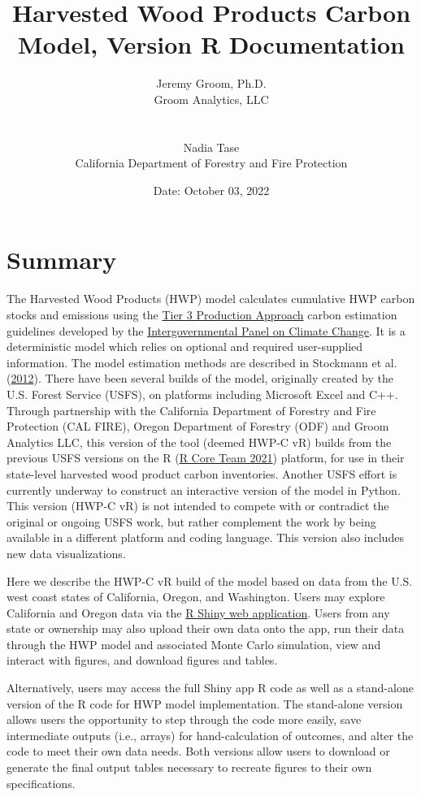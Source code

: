 \documentclass[
  openany]{book}
\title{Harvested Wood Products Carbon Model, Version R Documentation}
\author{Jeremy Groom, Ph.D.\\
Groom Analytics, LLC\\
\strut \\
Nadia Tase\\
California Department of Forestry and Fire Protection}
\date{Date: October 03, 2022}
\begin{document}
\frontmatter
\maketitle

\mainmatter
\hypertarget{sum}{%
\chapter{Summary}\label{sum}}

The Harvested Wood Products (HWP) model calculates cumulative HWP carbon
stocks and emissions using the
\href{https://www.ipcc-nggip.iges.or.jp/public/2006gl/pdf/4_Volume4/V4_04_Ch4_Forest_Land.pdf}{Tier
3 Production Approach} carbon estimation guidelines developed by the
\href{https://www.ipcc.ch/}{Intergovernmental Panel on Climate Change}.
It is a deterministic model which relies on optional and required
user-supplied information. The model estimation methods are described in
Stockmann et al. (\protect\hyperlink{ref-stockmann2012}{2012}). There
have been several builds of the model, originally created by the U.S.
Forest Service (USFS), on platforms including Microsoft Excel and C++.
Through partnership with the California Department of Forestry and Fire
Protection (CAL FIRE), Oregon Department of Forestry (ODF) and Groom
Analytics LLC, this version of the tool (deemed HWP-C vR) builds from
the previous USFS versions on the R (\protect\hyperlink{ref-R-base}{R
Core Team 2021}) platform, for use in their state-level harvested wood
product carbon inventories. Another USFS effort is currently underway to
construct an interactive version of the model in Python. This version
(HWP-C vR) is not intended to compete with or contradict the original or
ongoing USFS work, but rather complement the work by being available in
a different platform and coding language. This version also includes new
data visualizations.

Here we describe the HWP-C vR build of the model based on data from the
U.S. west coast states of California, Oregon, and Washington. Users may
explore California and Oregon data via the
\href{https://groomanalyticsllc.shinyapps.io/HWP-C-vR/}{R Shiny web
application}. Users from any state or ownership may also upload their
own data onto the app, run their data through the HWP model and
associated Monte Carlo simulation, view and interact with figures, and
download figures and tables.

Alternatively, users may access the full Shiny app R code as well as a
stand-alone version of the R code for HWP model implementation. The
stand-alone version allows users the opportunity to step through the
code more easily, save intermediate outputs (i.e., arrays) for
hand-calculation of outcomes, and alter the code to meet their own data
needs. Both versions allow users to download or generate the final
output tables necessary to recreate figures to their own specifications.
\end{document}
